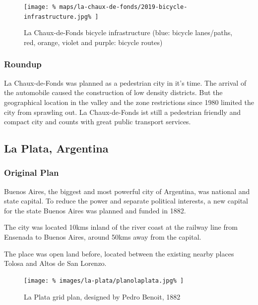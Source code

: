 \documentclass[twocolumn]{article}
\begin{document}
			\begin{figure}[H]
				\texttt{[image: \%
					maps/la-chaux-de-fonds/2019-bicycle-infrastructure.jpg\%
				]}
				\caption{La Chaux-de-Fonds bicycle infrastructure (blue: bicycle lanes/paths, red, orange, violet and purple: bicycle routes)\cite{OpenCycleMap:LaChauxDeFonds}}
				\label{fig:la-chaux-de-fonds-bicycle-infrastructure}
			\end{figure}
			
			
			\subsubsection{Roundup}
			La Chaux-de-Fonds was planned as a pedestrian city in it's time.
			The arrival of the automobile caused the construction of low density districts.
			But the geographical location in the valley and the zone restrictions since 1980 limited the city from sprawling out.
			La Chaux-de-Fonds ist still a pedestrian friendly and compact city and counts with great public transport services.
			
			
		\clearpage
		\begin{strip}
		\subsection{La Plata, Argentina}
		\end{strip}
		
			
			\subsubsection{Original Plan}
			Buenos Aires, the biggest and most powerful city of Argentina, was national and state capital. To reduce the power and separate political interests, a new capital for the state Buenos Aires was planned and funded in 1882.
			
			The city was located 10kms inland of the river coast at the railway line from Ensenada to Buenos Aires, around 50kms away from the capital.
			
			The place was open land before, located between the existing nearby places Tolosa and Altos de San Lorenzo.
			
			\begin{figure}[H]
				\texttt{[image: \%
					images/la-plata/planolaplata.jpg\%
				]}
				\caption{La Plata grid plan, designed by Pedro Benoit, 1882\cite{RecoletaCemetery:PedroBenoit}}
				\label{fig:img:plan-la-plata-1882}
			\end{figure}
			
\end{document}
